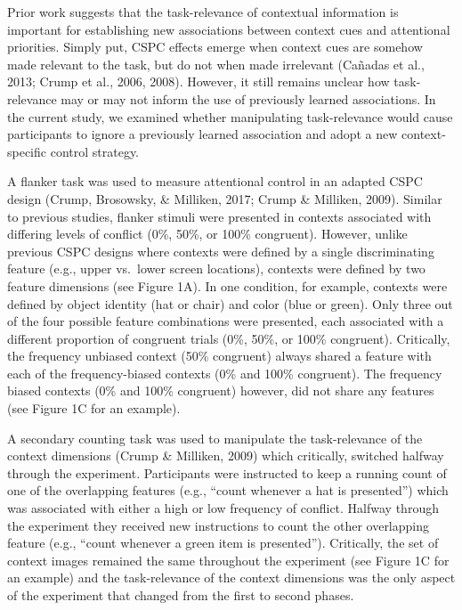 \documentclass[english,,man,floatsintext]{apa6}
\begin{document}
Prior work suggests that the task-relevance of contextual information is important for establishing new associations between context cues and attentional priorities. Simply put, CSPC effects emerge when context cues are somehow made relevant to the task, but do not when made irrelevant (Cañadas et al., 2013; Crump et al., 2006, 2008). However, it still remains unclear how task-relevance may or may not inform the use of previously learned associations. In the current study, we examined whether manipulating task-relevance would cause participants to ignore a previously learned association and adopt a new context-specific control strategy.

A flanker task was used to measure attentional control in an adapted CSPC design (Crump, Brosowsky, \& Milliken, 2017; Crump \& Milliken, 2009). Similar to previous studies, flanker stimuli were presented in contexts associated with differing levels of conflict (0\%, 50\%, or 100\% congruent). However, unlike previous CSPC designs where contexts were defined by a single discriminating feature (e.g., upper vs.~lower screen locations), contexts were defined by two feature dimensions (see Figure 1A). In one condition, for example, contexts were defined by object identity (hat or chair) and color (blue or green). Only three out of the four possible feature combinations were presented, each associated with a different proportion of congruent trials (0\%, 50\%, or 100\% congruent). Critically, the frequency unbiased context (50\% congruent) always shared a feature with each of the frequency-biased contexts (0\% and 100\% congruent). The frequency biased contexts (0\% and 100\% congruent) however, did not share any features (see Figure 1C for an example).

A secondary counting task was used to manipulate the task-relevance of the context dimensions (Crump \& Milliken, 2009) which critically, switched halfway through the experiment. Participants were instructed to keep a running count of one of the overlapping features (e.g., \enquote{count whenever a hat is presented}) which was associated with either a high or low frequency of conflict. Halfway through the experiment they received new instructions to count the other overlapping feature (e.g., \enquote{count whenever a green item is presented}). Critically, the set of context images remained the same throughout the experiment (see Figure 1C for an example) and the task-relevance of the context dimensions was the only aspect of the experiment that changed from the first to second phases.
\end{document}
